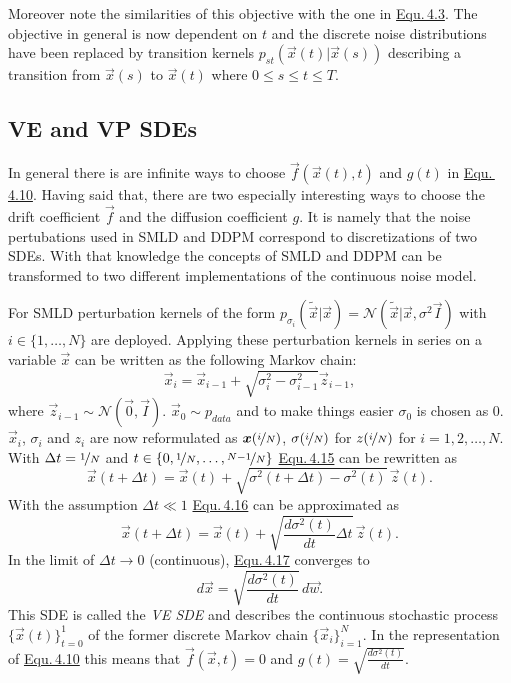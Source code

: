 Moreover note the similarities of this objective with the one in \hyperref[equ:4.3]{Equ.\,4.3}. The objective in general is now dependent on $t$ and the discrete noise distributions have been replaced by transition kernels $p_{st}(\vec{x}(t)|\vec{x}(s))$ describing a transition from $\vec{x}(s)$ to $\vec{x}(t)$ where $0\leq s \leq t \leq T$.
\subsection{VE and VP SDEs} \label{sec:4.4.4}
In general there is are infinite ways to choose $\vec{f}(\vec{x}(t),t)$ and $g(t)$ in \hyperref[equ:4.10]{Equ.\,4.10}. Having said that, there are two especially interesting ways to choose the drift coefficient $\vec{f}$ and the diffusion coefficient $g$. It is namely that the noise pertubations used in SMLD and DDPM correspond to discretizations of two SDEs. With that knowledge the concepts of SMLD and DDPM can be transformed to two different implementations of the continuous noise model.

For SMLD perturbation kernels of the form $p_{\sigma_i}(\tilde{\vec{x}}|\vec{x})=\mathcal{N}(\tilde{\vec{x}}|\vec{x},\sigma^2\vec{I})$ with $i\in\{1,\dots,N\}$ are deployed. Applying these perturbation kernels in series on a variable $\vec{x}$ can be written as the following Markov chain:
%
\begin{equation} \label{equ:4.15}
    \vec{x}_i=\vec{x}_{i-1}+\sqrt{\sigma_i^2-\sigma_{i-1}^2}\vec{z}_{i-1},
\end{equation}
%
where $\vec{z}_{i-1}\sim\mathcal{N}(\vec{0},\vec{I})$. $\vec{x}_0\sim p_{data}$ and to make things easier $\sigma_0$ is chosen as $0$. $\vec{x}_i$, $\sigma_i$ and $z_i$ are now reformulated as $\vec{x}(\nicefrac{i}{N})$, $\sigma(\nicefrac{i}{N})$ for $z(\nicefrac{i}{N})$ for $i=1,2,\dots,N$. With $\Delta t=\nicefrac{1}{N}$ and $t\in\{0,\nicefrac{1}{N},\dots,\nicefrac{N-1}{N}\}$ \hyperref[equ:4.15]{Equ.\,4.15} can be rewritten as
%
\begin{equation} \label{equ:4.16}
    \vec{x}(t+\Delta t)=\vec{x}(t)+\sqrt{\sigma^2(t+\Delta t)-\sigma^2(t)}\,\vec{z}(t).
\end{equation}
%
With the assumption $\Delta t \ll 1$ \hyperref[equ:4.16]{Equ.\,4.16} can be approximated as 
%
\begin{equation} \label{equ:4.17}
    \vec{x}(t+\Delta t)=\vec{x}(t)+\sqrt{\frac{d\sigma^2(t)}{dt}\Delta t}\,\vec{z}(t).
\end{equation}
%
In the limit of $\Delta t\rightarrow 0$ (continuous), \hyperref[equ:4.17]{Equ.\,4.17} converges to 
%
\begin{equation} \label{equ:4.18}
    d\vec{x}=\sqrt{\frac{d\sigma^2(t)}{dt}}\,d\vec{w}.
\end{equation}
%
This SDE is called the \textit{VE SDE} and describes the continuous stochastic process $\{\vec{x}(t)\}_{t=0}^1$ of the former discrete Markov chain $\{\vec{x}_i\}_{i=1}^N$. In the representation of \hyperref[equ:4.10]{Equ.\,4.10} this means that $\vec{f}(\vec{x},t)=0$ and $g(t)=\sqrt{\frac{d\sigma^2(t)}{dt}}$.

